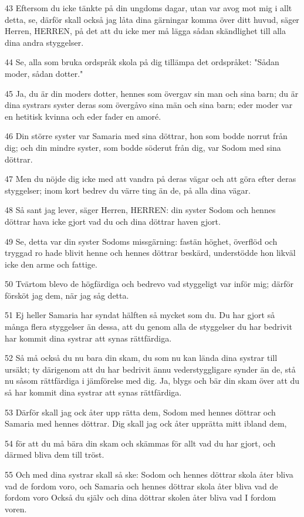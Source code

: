\par 43 Eftersom du icke tänkte på din ungdoms dagar, utan var avog mot mig i allt detta, se, därför skall också jag låta dina gärningar komma över ditt huvud, säger Herren, HERREN, på det att du icke mer må lägga sådan skändlighet till alla dina andra styggelser.
\par 44 Se, alla som bruka ordspråk skola på dig tillämpa det ordspråket: "Sådan moder, sådan dotter."
\par 45 Ja, du är din moders dotter, hennes som övergav sin man och sina barn; du är dina systrars syster deras som övergåvo sina män och sina barn; eder moder var en hetitisk kvinna och eder fader en amoré.
\par 46 Din större syster var Samaria med sina döttrar, hon som bodde norrut från dig; och din mindre syster, som bodde söderut från dig, var Sodom med sina döttrar.
\par 47 Men du nöjde dig icke med att vandra på deras vägar och att göra efter deras styggelser; inom kort bedrev du värre ting än de, på alla dina vägar.
\par 48 Så sant jag lever, säger Herren, HERREN: din syster Sodom och hennes döttrar hava icke gjort vad du och dina döttrar haven gjort.
\par 49 Se, detta var din syster Sodoms missgärning: fastän höghet, överflöd och tryggad ro hade blivit henne och hennes döttrar beskärd, understödde hon likväl icke den arme och fattige.
\par 50 Tvärtom blevo de högfärdiga och bedrevo vad styggeligt var inför mig; därför försköt jag dem, när jag såg detta.
\par 51 Ej heller Samaria har syndat hälften så mycket som du. Du har gjort så många flera styggelser än dessa, att du genom alla de styggelser du har bedrivit har kommit dina systrar att synas rättfärdiga.
\par 52 Så må också du nu bara din skam, du som nu kan lända dina systrar till ursäkt; ty därigenom att du har bedrivit ännu vederstyggligare synder än de, stå nu såsom rättfärdiga i jämförelse med dig. Ja, blygs och bär din skam över att du så har kommit dina systrar att synas rättfärdiga.
\par 53 Därför skall jag ock åter upp rätta dem, Sodom med hennes döttrar och Samaria med hennes döttrar. Dig skall jag ock åter upprätta mitt ibland dem,
\par 54 för att du må bära din skam och skämmas för allt vad du har gjort, och därmed bliva dem till tröst.
\par 55 Och med dina systrar skall så ske: Sodom och hennes döttrar skola åter bliva vad de fordom voro, och Samaria och hennes döttrar skola åter bliva vad de fordom voro Också du själv och dina döttrar skolen åter bliva vad I fordom voren.
